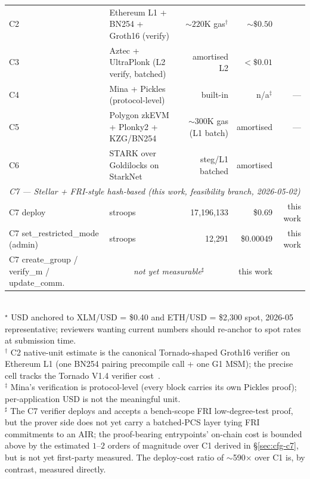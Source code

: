 \begin{table}[t]
\begin{tabular}{llrrr}
    \midrule
    C2  & Ethereum L1 + BN254 + Groth16 (verify)         & ${\sim}220$K gas$^\dagger$ & ${\sim}\$0.50$ & \cite{pertsev-2019-tornado,semaphore-2024} \\
    C3  & Aztec + UltraPlonk (L2 verify, batched)        & {amortised L2}             & ${<}\$0.01$    & \cite{aztec-2024} \\
    C4  & Mina + Pickles (protocol-level)                & {built-in}                 & {n/a}$^\ddagger$ & — \\
    C5  & Polygon zkEVM + Plonky2 + KZG/BN254            & ${\sim}300$K gas (L1 batch) & {amortised}    & — \\
    C6  & STARK over Goldilocks on StarkNet              & {steg/L1 batched}          & {amortised}    & \cite{ben-sasson-2018-stark} \\
    \midrule
    \multicolumn{5}{l}{\emph{C7 --- Stellar + FRI-style hash-based (this work, feasibility branch, 2026-05-02)}} \\
    \quad C7 deploy                                     & stroops   & 17{,}196{,}133 & \$0.69    & this work \\
    \quad C7 set\_restricted\_mode (admin)              & stroops   & 12{,}291      & \$0.00049  & this work \\
    \quad C7 create\_group / verify\_m / update\_comm.  & \multicolumn{2}{c}{\emph{not yet measurable}$^{\sharp}$} & this work \\
    \bottomrule
  \end{tabular}
  \\[0.5em]
  \footnotesize
  $^\star$ USD anchored to XLM/USD = \$0.40 and ETH/USD = \$2{,}300
  spot, 2026-05 representative; reviewers wanting current numbers
  should re-anchor to spot rates at submission time.\\
  $^\dagger$ C2 native-unit estimate is the canonical Tornado-shaped
  Groth16 verifier on Ethereum L1 (one BN254 pairing precompile call
  + one G1 MSM); the precise cell tracks the Tornado V1.4 verifier
  cost~\cite{pertsev-2019-tornado}. \\
  $^\ddagger$ Mina's verification is protocol-level (every block
  carries its own Pickles proof); per-application USD is not the
  meaningful unit. \\
  $^\sharp$ The C7 verifier deploys and accepts a bench-scope FRI
  low-degree-test proof, but the prover side does not yet carry a
  batched-PCS layer tying FRI commitments to an AIR; the
  proof-bearing entrypoints' on-chain cost is bounded above by the
  estimated $1$--$2$ orders of magnitude over C1 derived in
  \S\ref{sec:cfg-c7}, but is not yet first-party measured. The
  deploy-cost ratio of $\sim$590$\times$ over C1 is, by contrast,
  measured directly.
\end{table}
